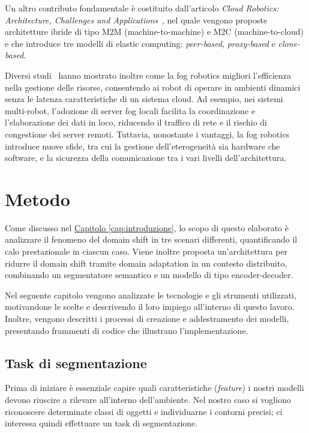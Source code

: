 \documentclass[12pt]{report}
\begin{document}
Un altro contributo fondamentale è costituito dall'articolo \textit{Cloud Robotics: Architecture, Challenges and Applications}~\cite{6201212}, nel quale vengono proposte architetture ibride di tipo M2M (machine-to-machine) e M2C (machine-to-cloud) e che introduce tre modelli di elastic computing: \textit{peer-based}, \textit{proxy-based} e \textit{clone-based}.

Diversi studi~\cite{9360855} hanno mostrato inoltre come la fog robotics migliori l'efficienza nella gestione delle risorse, consentendo ai robot di operare in ambienti dinamici senza le latenza caratteristiche di un sistema cloud. Ad esempio, nei sistemi multi-robot, l'adozione di server fog locali facilita la coordinazione e l'elaborazione dei dati in loco, riducendo il traffico di rete e il rischio di congestione dei server remoti. Tuttavia, nonostante i vantaggi, la fog robotics introduce nuove sfide, tra cui la gestione dell'eterogeneità sia hardware che software, e la sicurezza della comunicazione tra i vari livelli dell'architettura.

\chapter{Metodo}
\label{chap:metodo}

Come discusso nel \hyperref[cap:introduzione]{Capitolo \ref{cap:introduzione}}, lo scopo di questo elaborato è analizzare il fenomeno del domain shift in tre scenari differenti, quantificando il calo prestazionale in ciascun caso. Viene inoltre proposta un'architettura per ridurre il domain shift tramite domain adaptation in un contesto distribuito, combinando un segmentatore semantico e un modello di tipo encoder-decoder.

Nel seguente capitolo vengono analizzate le tecnologie e gli strumenti utilizzati, motivandone le scelte e descrivendo il loro impiego all'interno di questo lavoro. Inoltre, vengono descritti i processi di creazione e addestramento dei modelli, presentando frammenti di codice che illustrano l'implementazione.

\section{Task di segmentazione}
\label{sec:task_di_segmentazione}

Prima di iniziare è essenziale capire quali caratteristiche (\textit{feature}) i nostri modelli devono riuscire a rilevare all'interno dell'ambiente. Nel nostro caso si vogliono riconoscere determinate classi di oggetti e individuarne i contorni precisi; ci interessa quindi effettuare un task di segmentazione.
\end{document}
